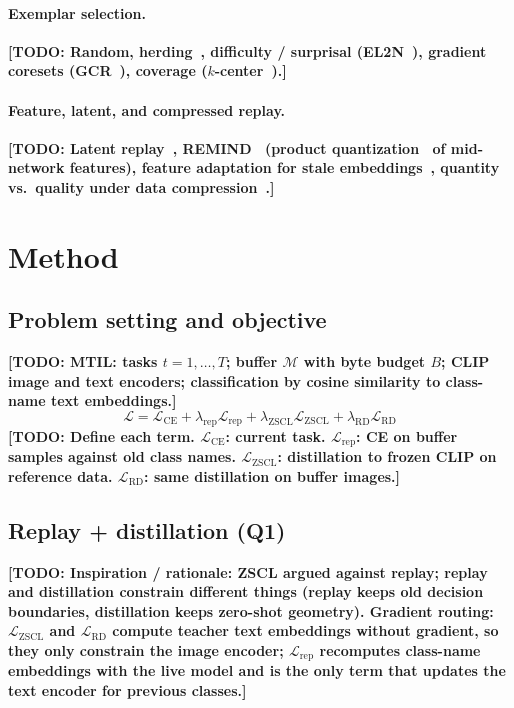 \documentclass[10pt,twocolumn,letterpaper]{article}
\newcommand{\TODO}[1]{\textbf{\color{red}[TODO: #1]}}
\newcommand{\Q}[1]{\textbf{Q#1}\xspace}     %
\newcommand{\Lce}{\mathcal{L}_{\text{CE}}}
\newcommand{\Lrep}{\mathcal{L}_{\text{rep}}}
\newcommand{\Lzscl}{\mathcal{L}_{\text{ZSCL}}}
\newcommand{\Lrd}{\mathcal{L}_{\text{RD}}}
\newcommand{\buf}{\mathcal{M}}      %
\newcommand{\budget}{B}             %
\begin{document}
\paragraph{Exemplar selection.}
\TODO{Random, herding~\cite{welling2009herding,rebuffi2017icarl}, difficulty / surprisal (EL2N~\cite{paul2021el2n}), gradient coresets (GCR~\cite{tiwari2022gcr}), coverage ($k$-center~\cite{sener2018coreset}).}

\paragraph{Feature, latent, and compressed replay.}
\TODO{Latent replay~\cite{pellegrini2020latent}, REMIND~\cite{hayes2020remind} (product quantization~\cite{jegou2011pq} of mid-network features), feature adaptation for stale embeddings~\cite{iscen2020feature,yu2020sdc}, quantity vs.\ quality under data compression~\cite{wang2022compression}.}

\section{Method}
\label{sec:method}

\subsection{Problem setting and objective}
\label{sec:method-setting}
\TODO{MTIL: tasks $t=1,\dots,T$; buffer $\buf$ with byte budget $\budget$; CLIP image and text encoders; classification by cosine similarity to class-name text embeddings.}
\begin{equation}
  \mathcal{L} = \Lce + \lambda_{\text{rep}} \Lrep + \lambda_{\text{ZSCL}} \Lzscl + \lambda_{\text{RD}} \Lrd
  \label{eq:loss}
\end{equation}
\TODO{Define each term. $\Lce$: current task. $\Lrep$: CE on buffer samples against old class names. $\Lzscl$: distillation to frozen CLIP on reference data. $\Lrd$: same distillation on buffer images.}

\subsection{Replay + distillation (\Q{1})}
\label{sec:method-rd}
\TODO{Inspiration / rationale: ZSCL argued against replay; replay and distillation constrain different things (replay keeps old decision boundaries, distillation keeps zero-shot geometry). Gradient routing: $\Lzscl$ and $\Lrd$ compute teacher text embeddings without gradient, so they only constrain the image encoder; $\Lrep$ recomputes class-name embeddings with the live model and is the only term that updates the text encoder for previous classes.}
\end{document}
